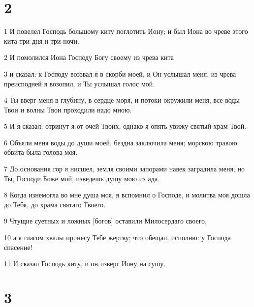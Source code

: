 \chapter{2}

\par 1 И повелел Господь большому киту поглотить Иону; и был Иона во чреве этого кита три дня и три ночи.
\par 2 И помолился Иона Господу Богу своему из чрева кита
\par 3 и сказал: к Господу воззвал я в скорби моей, и Он услышал меня; из чрева преисподней я возопил, и Ты услышал голос мой.
\par 4 Ты вверг меня в глубину, в сердце моря, и потоки окружили меня, все воды Твои и волны Твои проходили надо мною.
\par 5 И я сказал: отринут я от очей Твоих, однако я опять увижу святый храм Твой.
\par 6 Объяли меня воды до души моей, бездна заключила меня; морскою травою обвита была голова моя.
\par 7 До основания гор я нисшел, земля своими запорами навек заградила меня; но Ты, Господи Боже мой, изведешь душу мою из ада.
\par 8 Когда изнемогла во мне душа моя, я вспомнил о Господе, и молитва моя дошла до Тебя, до храма святаго Твоего.
\par 9 Чтущие суетных и ложных [богов] оставили Милосердаго своего,
\par 10 а я гласом хвалы принесу Тебе жертву; что обещал, исполню: у Господа спасение!
\par 11 И сказал Господь киту, и он изверг Иону на сушу.

\chapter{3}

